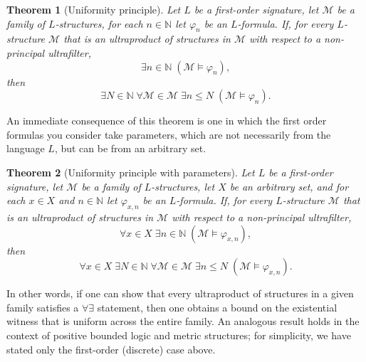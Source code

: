 \documentclass[11pt]{amsart}
\newtheorem{theorem}{Theorem}[section]
\theoremstyle{definition}
\theoremstyle{remark}
\def\NN{\mathbb{N}}
\begin{document}
\begin{theorem}[Uniformity principle]
Let $L$ be a first-order signature, let $\mathscr{M}$ be a family of $L$-structures, for each $n \in \NN$ let $\varphi_{n}$ be an $L$-formula. If, for every $L$-structure $\mathcal{M}$ that is an ultraproduct of structures in $\mathscr{M}$ with respect to a non-principal ultrafilter,
\[
  \exists n \in \NN\; (\mathcal{M} \vDash \varphi_{n}),
\]
then 
\[
  \exists N \in \NN\; \forall \mathcal{M} \in \mathscr{M}\; \exists n \leq N\; (\mathcal{M} \vDash \varphi_{n}).
\]
\end{theorem}
An immediate consequence of this theorem is one in which the first order formulas you consider take parameters, which are not necessarily from the language $L$, but can be from an arbitrary set.

\begin{theorem}[Uniformity principle with parameters]
Let $L$ be a first-order signature, let $\mathscr{M}$ be a family of $L$-structures, let $X$ be an arbitrary set, and for each $x \in X$ and $n \in \NN$ let $\varphi_{x,n}$ be an $L$-formula. If, for every
$L$-structure $\mathcal{M}$ that is an ultraproduct of structures in $\mathscr{M}$ with respect to a non-principal ultrafilter,
\[
  \forall x \in X\; \exists n \in \NN\; (\mathcal{M} \vDash \varphi_{x,n}),
\]
then
\[
  \forall x \in X\; \exists N \in \NN\; \forall \mathcal{M} \in \mathscr{M}\; \exists n \leq N\; (\mathcal{M} \vDash \varphi_{x,n}).
\]
\end{theorem}

In other words, if one can show that every ultraproduct of structures in a given family satisfies a $\forall\exists$ statement, then one obtains a bound on the existential witness that is uniform across the entire family. An analogous result holds in the context of positive bounded logic and metric structures; for simplicity, we have stated only the first-order (discrete) case above.
\end{document}
